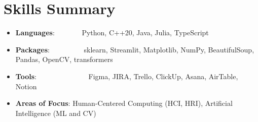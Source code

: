 \documentclass[a4paper,11pt]{extarticle}
\newcommand{\resumeSkillItem}[2]{
	\item\small{
		\textbf{#1}{: #2 \vspace{-2pt}}
	}
}
\newcommand{\resumeSubItem}[2]{\resumeSkillItem{#1}{#2}\vspace{-5pt}}
\newcommand{\resumeSubHeadingListStart}{
    \begin{itemize}[leftmargin=0.15in,label={}]}
\newcommand{\resumeSubHeadingListEnd}{\end{itemize}}
\begin{document}
\section{Skills Summary}
	\resumeSubHeadingListStart
		\resumeSubItem{Languages}
            {\hspace{0.2mm}~~~~~~~Python, C++20, Java, Julia, TypeScript}
		\resumeSubItem{Packages}
            {\hspace{0.2mm}~~~~~~~~~sklearn, Streamlit, Matplotlib, NumPy, BeautifulSoup, Pandas, OpenCV, transformers}
            \resumeSubItem{Tools}
            {\hspace{0.2mm}~~~~~~~~~~~~~~Figma, JIRA, Trello, ClickUp, Asana, AirTable, Notion }
            \resumeSubItem{Areas of Focus}
            {\hspace{0.2mm}Human-Centered Computing (HCI, HRI), Artificial Intelligence (ML and CV)}          
	\resumeSubHeadingListEnd
\end{document}
